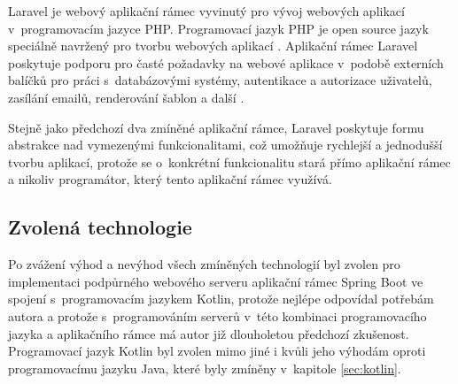 Laravel je webový aplikační rámec vyvinutý pro vývoj webových aplikací v~programovacím jazyce PHP. Programovací jazyk PHP je open source jazyk speciálně navržený pro tvorbu webových aplikací \cite{what_is_php}. Aplikační rámec Laravel poskytuje podporu pro časté požadavky na webové aplikace v~podobě externích balíčků pro práci s~databázovými systémy, autentikace a autorizace uživatelů, zasílání emailů, renderování šablon a další \cite{laravel}. 

Stejně jako předchozí dva zmíněné aplikační rámce, Laravel poskytuje formu abstrakce nad vymezenými funkcionalitami, což umožňuje rychlejší a jednodušší tvorbu aplikací, protože se o~konkrétní funkcionalitu stará přímo aplikační rámec a nikoliv programátor, který tento aplikační rámec využívá.


\subsection{Zvolená technologie}

Po zvážení výhod a nevýhod všech zmíněných technologií byl zvolen pro implementaci podpůrného webového serveru aplikační rámec Spring Boot ve spojení s~programovacím jazykem Kotlin, protože nejlépe odpovídal potřebám autora a protože s~programováním serverů v~této kombinaci programovacího jazyka a aplikačního rámce má autor již dlouholetou předchozí zkušenost. Programovací jazyk Kotlin byl zvolen mimo jiné i kvůli jeho výhodám oproti programovacímu jazyku Java, které byly zmíněny v~kapitole \ref{sec:kotlin}.
